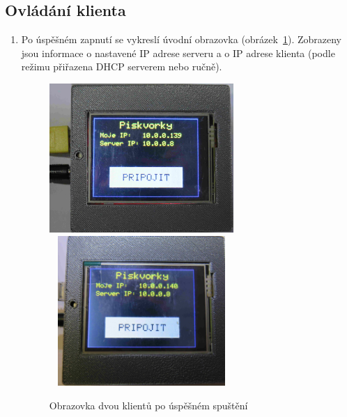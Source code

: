 \subsection{Ovládání klienta}
\begin{enumerate}
\item Po úspěšném zapnutí se vykreslí úvodní obrazovka (obrázek~\ref{fig:faze1}).  Zobrazeny jsou informace o nastavené IP adrese serveru a o IP adrese klienta (podle režimu přiřazena DHCP serverem nebo ručně).
\begin{figure}[H]
\centering
\includegraphics[width=7cm]{img/gameFlow/phase01a.jpg}
\includegraphics[width=7cm, height=5.7cm]{img/gameFlow/phase01b.jpg}
\caption{\label{fig:faze1} Obrazovka dvou klientů po úspěšném spuštění}
\end{figure}


\end{enumerate}
